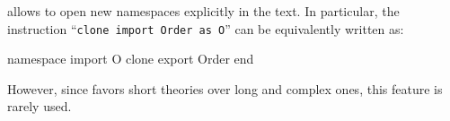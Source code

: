 \why allows to open new namespaces explicitly in the text. In particular,
the instruction ``\texttt{clone import Order as O}'' can be equivalently
written as:
\begin{whycode}
namespace import O
  clone export Order
end
\end{whycode}
However, since \why favors short theories over long and complex ones,
this feature is rarely used.


